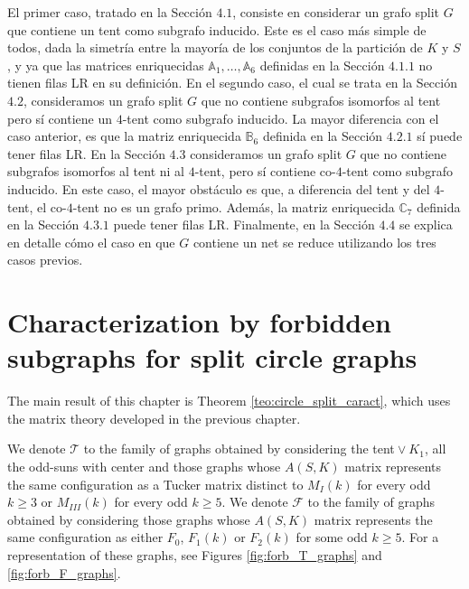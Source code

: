 \documentclass[12pt]{book}
\theoremstyle{plain}
\theoremstyle{remark}
\begin{document}
El primer caso, tratado en la Sección $4.1$, consiste en considerar un grafo split $G$ que contiene un tent como subgrafo inducido. Este es el caso más simple de todos, dada la simetría entre la mayoría de los conjuntos de la partición de $K$ y $S$, y ya que las matrices enriquecidas $\mathbb A_1, \ldots, \mathbb A_6$ definidas en la Sección $4.1.1$ no tienen filas LR en su definición.
En el segundo caso, el cual se trata en la Sección $4.2$, consideramos un grafo split $G$ que no contiene subgrafos isomorfos al tent pero sí contiene un $4$-tent como subgrafo inducido. La mayor diferencia con el caso anterior, es que la matriz enriquecida $\mathbb B_6$ definida en la Sección $4.2.1$ sí puede tener filas LR.
En la Sección $4.3$ consideramos un grafo split $G$ que no contiene subgrafos isomorfos al tent ni al $4$-tent, pero sí contiene co-$4$-tent como subgrafo inducido. En este caso, el mayor obstáculo es que, a diferencia del tent y del $4$-tent, el co-$4$-tent no es un grafo primo. Además, la matriz enriquecida $\mathbb C_7$ definida en la Sección $4.3.1$ puede tener filas LR.
Finalmente, en la Sección $4.4$ se explica en detalle cómo el caso en que $G$ contiene un net se reduce utilizando los tres casos previos. 



%
\chapter{Characterization by forbidden subgraphs for split circle graphs} \label{chapter:split_circle_graphs}

The main result of this chapter is Theorem \ref{teo:circle_split_caract}, which uses the matrix theory de\-vel\-oped in the previous chapter.

We denote $\mathcal{T}$ to the family of graphs obtained by considering the tent${}\vee{}K_1$, all the odd-suns with center and those graphs whose $A(S,K)$ matrix represents the same configuration as a Tucker matrix distinct to $M_I(k)$ for every odd $k\geq 3$ or $M_{III}(k)$ for every odd $k\geq 5$.
We denote $\mathcal{F}$ to the family of graphs obtained by considering those graphs whose $A(S,K)$ matrix represents the same configuration as either $F_0$, $F_1(k)$ or $F_2(k)$ for some odd $k \geq 5$.
For a representation of these graphs, see Figures \ref{fig:forb_T_graphs} and \ref{fig:forb_F_graphs}.
\end{document}
